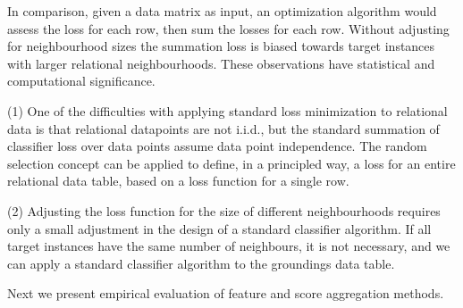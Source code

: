 \documentclass[oribibl]{llncs}%
\begin{document}
In comparison, given a data matrix as input, an optimization algorithm would assess the loss for each row, then sum the losses for each row.  Without adjusting for neighbourhood sizes the summation loss is biased towards target instances with larger relational neighbourhoods. These observations have statistical and computational significance.  

(1) One of the difficulties with applying standard loss minimization to relational data is that relational datapoints are not i.i.d., but the standard summation of classifier loss over data points assume  data point independence. The random selection concept can be applied to define, in a principled way, a loss for an entire relational data table, based on a loss function for a single row.  

(2) Adjusting the loss function for the size of different neighbourhoods requires only a small adjustment in the design of a standard classifier algorithm. If all target instances have the same number of neighbours, it is not necessary, and we can apply a standard classifier algorithm to the groundings data table.

Next we present empirical evaluation of feature and score aggregation methods.
\end{document}
